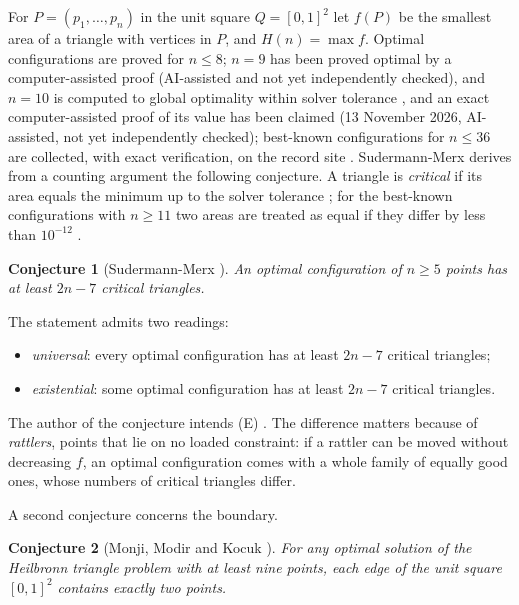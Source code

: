 \documentclass[11pt]{amsart}
\newtheorem{conjecture}{Conjecture}
\theoremstyle{definition}
\begin{document}
For $P = (p_1,\dots,p_n)$ in the unit square $Q = [0,1]^2$ let $f(P)$ be the smallest area of a triangle with vertices in $P$, and $H(n) = \max f$. Optimal configurations are proved for $n \le 8$; $n = 9$ has been proved optimal by a computer-assisted proof \cite{N9} (AI-assisted and not yet independently checked), and $n = 10$ is computed to global optimality within solver tolerance \cite{SM}, and an exact computer-assisted proof of its value has been claimed \cite{Pan10} (13 November 2026, AI-assisted, not yet independently checked); best-known configurations for $n \le 36$ are collected, with exact verification, on the record site \cite{Stead}. %
Sudermann-Merx derives from a counting argument \cite[Sec.~7.1]{SM} the following conjecture. A triangle is \emph{critical} if its area equals the minimum up to the solver tolerance \cite[Sec.~5.1]{SM}; for the best-known configurations with $n \ge 11$ two areas are treated as equal if they differ by less than $10^{-12}$ \cite[Sec.~7]{SM}.

\begin{conjecture}[{Sudermann-Merx \cite[Conjecture~1]{SM}}]\label{conj:SM}
An optimal configuration of $n \ge 5$ points has at least $2n-7$ critical triangles.
\end{conjecture}

The statement admits two readings:
\begin{itemize}
\item[(U)] \emph{universal}: every optimal configuration has at least $2n-7$ critical triangles;
\item[(E)] \emph{existential}: some optimal configuration has at least $2n-7$ critical triangles.
\end{itemize}
The author of the conjecture intends (E) \cite{SMpc}. The difference matters because of \emph{rattlers}, points that lie on no loaded constraint: if a rattler can be moved without decreasing $f$, an optimal configuration comes with a whole family of equally good ones, whose numbers of critical triangles differ.

A second conjecture concerns the boundary.

\begin{conjecture}[{Monji, Modir and Kocuk \cite[Conjecture~1, Sec.~3.2.3]{MMK}}]\label{conj:MMK}
For any optimal solution of the Heilbronn triangle problem with at least nine points, each edge of the unit square $[0,1]^2$ contains exactly two points.
\end{conjecture}
\end{document}
